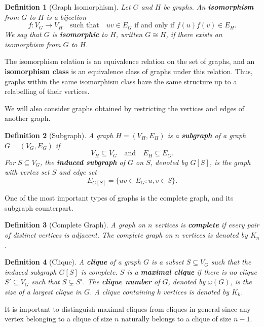 \documentclass[11pt]{report}
\newtheorem{definition}{Definition}[section]
\begin{document}
\begin{definition}[Graph Isomorphism] \label{def::graph_isomorphism}
  Let $G$ and $H$ be graphs. An \textbf{isomorphism} from $G$ to $H$ is a bijection
  \[
  f:V_G\rightarrow V_H \quad \text{such that} \quad uv\in E_G \text{ if and only if } f(u)f(v)\in E_H.
  \]
  We say that $G$ is \textbf{isomorphic} to $H$, written $G\cong H$, if there exists an isomorphism from $G$ to $H$.
\end{definition}

The isomorphism relation is an equivalence relation on the set of graphs, and an \textbf{isomorphism class} is an equivalence class of graphs under this relation. Thus, graphs within the same isomorphism class have the same structure up to a relabelling of their vertices.

We will also consider graphs obtained by restricting the vertices and edges of another graph.

\begin{definition}[Subgraph] \label{def::subgraph}
  A graph $H=(V_H,E_H)$ is a \textbf{subgraph} of a graph $G=(V_G,E_G)$ if
  \[
  V_H\subseteq V_G \quad \text{and} \quad E_H\subseteq E_G.
  \]
  For $S\subseteq V_G$, the \textbf{induced subgraph} of $G$ on $S$, denoted by $G[S]$, is the graph with vertex set $S$ and edge set
  \[
  E_{G[S]}=\{uv\in E_G:u,v\in S\}.
  \]
\end{definition}

One of the most important types of graphs is the complete graph, and its subgraph counterpart. 

\begin{definition}[Complete Graph] \label{def::complete_graph}
  A graph on $n$ vertices is \textbf{complete} if every pair of distinct vertices is adjacent. The complete graph on $n$ vertices is denoted by $K_n$.
\end{definition}

\begin{definition}[Clique] \label{def::clique}
  A \textbf{clique} of a graph $G$ is a subset $S\subseteq V_G$ such that the induced subgraph $G[S]$ is complete. $S$ is a \textbf{maximal clique} if there is no clique $S' \subseteq V_G$ such that
  $S \subsetneq S'$. The \textbf{clique number} of $G$, denoted by $\omega(G)$, is the size of a largest clique in $G$. A clique containing $k$ vertices is denoted by $K_k$. 
\end{definition}

It is important to distinguish maximal cliques from cliques in general since any vertex belonging to a clique of size $n$ naturally belongs to a clique of size $n-1$.
\end{document}
